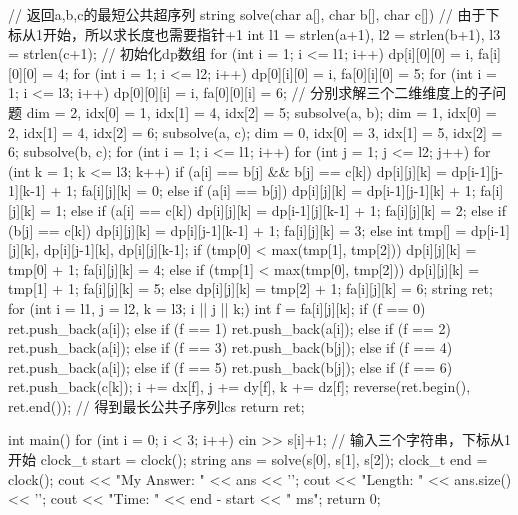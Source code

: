 \documentclass[12pt, a4paper, oneside]{ctexart}
\numberwithin{equation}{section}  %
\begin{document}
\begin{cppcode}
// 返回a,b,c的最短公共超序列
string solve(char a[], char b[], char c[]) {
    // 由于下标从1开始，所以求长度也需要指针+1
    int l1 = strlen(a+1), l2 = strlen(b+1), l3 = strlen(c+1);
    // 初始化dp数组
    for (int i = 1; i <= l1; i++) dp[i][0][0] = i, fa[i][0][0] = 4;
    for (int i = 1; i <= l2; i++) dp[0][i][0] = i, fa[0][i][0] = 5;
    for (int i = 1; i <= l3; i++) dp[0][0][i] = i, fa[0][0][i] = 6;
    // 分别求解三个二维维度上的子问题
    dim = 2, idx[0] = 1, idx[1] = 4, idx[2] = 5;
    subsolve(a, b);
    dim = 1, idx[0] = 2, idx[1] = 4, idx[2] = 6;
    subsolve(a, c);
    dim = 0, idx[0] = 3, idx[1] = 5, idx[2] = 6;
    subsolve(b, c);
    for (int i = 1; i <= l1; i++) {
        for (int j = 1; j <= l2; j++) {
            for (int k = 1; k <= l3; k++) {
                if (a[i] == b[j] && b[j] == c[k]) {
                    dp[i][j][k] = dp[i-1][j-1][k-1] + 1;
                    fa[i][j][k] = 0;
                } else if (a[i] == b[j]) {
                    dp[i][j][k] = dp[i-1][j-1][k] + 1;
                    fa[i][j][k] = 1;
                } else if (a[i] == c[k]) {
                    dp[i][j][k] = dp[i-1][j][k-1] + 1;
                    fa[i][j][k] = 2;
                } else if (b[j] == c[k]) {
                    dp[i][j][k] = dp[i][j-1][k-1] + 1;
                    fa[i][j][k] = 3;
                } else {
                    int tmp[] = {dp[i-1][j][k], dp[i][j-1][k], dp[i][j][k-1]};
                    if (tmp[0] < max(tmp[1], tmp[2])) {
                        dp[i][j][k] = tmp[0] + 1;
                        fa[i][j][k] = 4;
                    } else if (tmp[1] < max(tmp[0], tmp[2])) {
                        dp[i][j][k] = tmp[1] + 1;
                        fa[i][j][k] = 5;
                    } else {
                        dp[i][j][k] = tmp[2] + 1;
                        fa[i][j][k] = 6;
                    }
                }
            }
        }
    }
    string ret;
    for (int i = l1, j = l2, k = l3; i || j || k;) {
        int f = fa[i][j][k];
        if (f == 0) ret.push_back(a[i]);
        else if (f == 1) ret.push_back(a[i]);
        else if (f == 2) ret.push_back(a[i]);
        else if (f == 3) ret.push_back(b[j]);
        else if (f == 4) ret.push_back(a[i]);
        else if (f == 5) ret.push_back(b[j]);
        else if (f == 6) ret.push_back(c[k]);
        i += dx[f], j += dy[f], k += dz[f];
    }
    reverse(ret.begin(), ret.end());  // 得到最长公共子序列lcs
    return ret;
}

int main() {
    for (int i = 0; i < 3; i++) cin >> s[i]+1;  // 输入三个字符串，下标从1开始
    clock_t start = clock();
    string ans = solve(s[0], s[1], s[2]);
    clock_t end = clock();
    cout << "My Answer: " << ans << '\n';
    cout << "Length: " << ans.size() << '\n';
    cout << "Time: " << end - start << " ms";
    return 0;
}
\end{cppcode}
\end{document}
